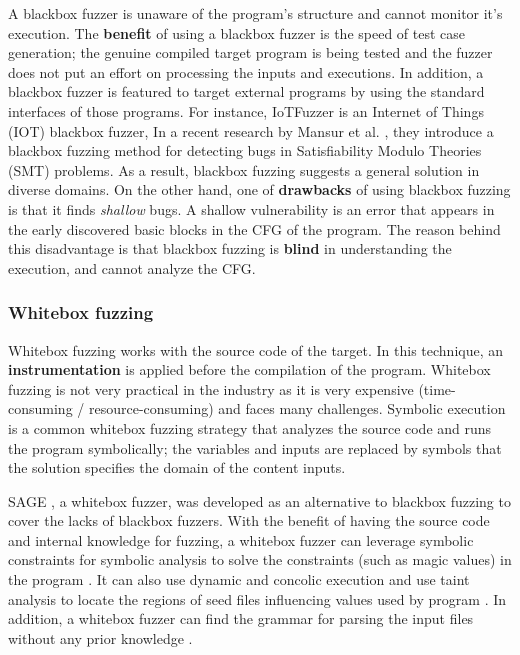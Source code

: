 A blackbox fuzzer is unaware of the program's structure and cannot monitor it's execution. The \textbf{benefit} of using a blackbox fuzzer is the speed of test case generation; the genuine compiled target program is being tested and the fuzzer does not put an effort on processing the inputs and executions. In addition, a blackbox fuzzer is featured to target external programs by using the standard interfaces of those programs. For instance, IoTFuzzer \cite{chen2018iotfuzzer} is an Internet of Things (IOT) blackbox fuzzer,  
In a recent research by Mansur et al. \cite{mansur2020detecting}, they introduce a blackbox fuzzing method for detecting bugs in Satisfiability Modulo Theories (SMT) problems. As a result, blackbox fuzzing suggests a general solution in diverse domains. On the other hand, one of \textbf{drawbacks} of using blackbox fuzzing is that it finds \textit{shallow} bugs. A shallow vulnerability is an error that appears in the early discovered basic blocks in the CFG of the program. The reason behind this disadvantage is that blackbox fuzzing is \textbf{blind} in understanding the execution, and cannot analyze the CFG.

% 
\subsubsection{Whitebox fuzzing}
Whitebox fuzzing works with the source code of the target. In this technique, an \textbf{instrumentation} is applied before the compilation of the program. Whitebox fuzzing is not very practical in the industry as it is very expensive (time-consuming / resource-consuming) and faces many challenges. Symbolic execution \cite{king1976symbolic} is a common whitebox fuzzing strategy that analyzes the source code and runs the program symbolically; the variables and inputs are replaced by symbols that the solution specifies the domain of the content inputs. 

SAGE \cite{godefroid2012sage}, a whitebox fuzzer, was developed as an alternative to blackbox fuzzing to cover the lacks of blackbox fuzzers. With the benefit of having the source code and internal knowledge for fuzzing, a whitebox fuzzer can leverage symbolic constraints for symbolic analysis to solve the constraints (such as magic values) in the program \cite{cadar2011symbolic}. It can also use dynamic and concolic execution \cite{stephens2016driller} and use taint analysis to locate the regions of seed files influencing values used by program \cite{ganesh2009taint}. In addition, a whitebox fuzzer can find the grammar for parsing the input files without any prior knowledge \cite{godefroid2008grammar}.

